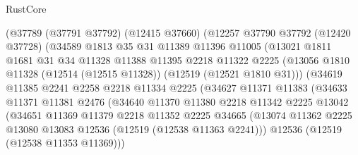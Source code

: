 \begin{lexlean}{RustCore}
\begin{coremodule}
                    (@37789
                      (@37791 @37792)
                      (@12415 @37660)
                      (@12257
                        @37790
                        @37792
                        (@12420 @37728)
                        (@34589
                          @1813
                          @35
                          @31
                          @11389
                          @11396
                          @11005
                          (@13021
                            @1811
                            @1681
                            @31
                            @34
                            @11328
                            @11388
                            @11395
                            @2218
                            @11322
                            @2225
                            (@13056
                              @1810
                              @11328
                              (@12514 (@12515 @11328))
                              (@12519 (@12521 @1810 @31)))
                            (@34619
                              @11385
                              @2241
                              @2258
                              @2218
                              @11334
                              @2225
                              (@34627
                                @11371
                                @11383
                                (@34633
                                  @11371
                                  @11381
                                  @2476
                                  (@34640
                                    @11370
                                    @11380
                                    @2218
                                    @11342
                                    @2225
                                    @13042
                                    (@34651
                                      @11369
                                      @11379
                                      @2218
                                      @11352
                                      @2225
                                      @34665
                                      (@13074
                                        @11362
                                        @2225
                                        @13080
                                        @13083
                                        @12536
                                        (@12519 (@12538 @11363 @2241)))
                                      @12536
                                      (@12519 (@12538 @11353 @11369)))

\end{coremodule}
\end{lexlean}
